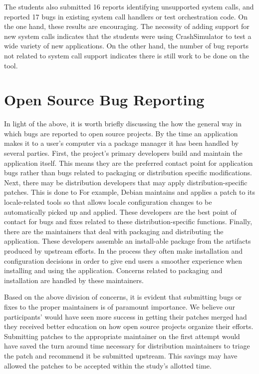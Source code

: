 The students also submitted 16 reports identifying unsupported system calls, and reported 17 bugs in
existing system call handlers or test orchestration code.
On the one hand, these results are encouraging.  The necessity of adding
support for new system calls
indicates that the students were
using CrashSimulator to test a wide variety of new applications.
On the other hand, the number of bug reports not related to system call support
indicates there is still work to be done on the tool.

\section{Open Source Bug Reporting}

In light of the above, it is worth briefly discussing the how the general way in which bugs are reported to open source projects.
By the time an application makes it to a user's computer via a package manager it has been handled by several parties.
First,
the project's primary developers build and maintain the application itself.
This means they are the preferred contact point for application bugs rather than bugs related to packaging or distribution specific modifications.
Next, there may be distribution developers that may apply distribution-specific patches.  This is done to 
For example, Debian maintains and applies a patch to its locale-related tools so that allows locale configuration changes to be automatically picked up and applied.
These developers are the best point of contact for bugs and fixes related to these distribution-specific functions.
Finally,
there are the maintainers that deal with 
packaging and distributing the application.
These developers assemble an install-able package from the artifacts produced by upstream efforts.
In the process they often make installation and configuration decisions in order to give end users a smoother experience when installing and using the application.
Concerns related to packaging and installation are handled by these maintainers.

Based on the above division of concerns,
it is evident that submitting bugs or fixes to the proper maintainers is of paramount importance.
We believe our participants' would have seen more success in getting their patches merged had they received better education on how open source projects organize their efforts.
Submitting patches to the appropriate maintainer on the first attempt would have saved the turn around time necessary for distribution maintainers to triage the patch and recommend it be submitted upstream.
This savings may have allowed the patches to be accepted within the study's allotted time.


